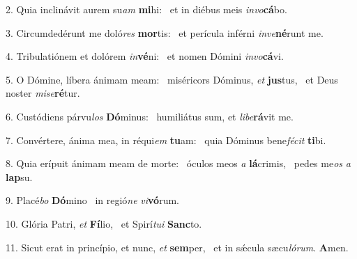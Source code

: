 2. Quia inclinávit aurem su\textit{am} \textbf{mi}hi: \ast\  et in diébus meis \textit{in}\textit{vo}\textbf{cá}bo.\

3. Circumdedérunt me doló\textit{res} \textbf{mor}tis: \ast\  et perícula inférni \textit{in}\textit{ve}\textbf{né}runt me.\

4. Tribulatiónem et dolórem \textit{in}\textbf{vé}ni: \ast\  et nomen Dómini \textit{in}\textit{vo}\textbf{cá}vi.\

5. O Dómine, líbera ánimam meam: \dag\  miséricors Dóminus, \textit{et} \textbf{jus}tus, \ast\  et Deus noster \textit{mi}\textit{se}\textbf{ré}tur.\

6. Custódiens párvu\textit{los} \textbf{Dó}minus: \ast\  humiliátus sum, et \textit{li}\textit{be}\textbf{rá}vit me.\

7. Convértere, ánima mea, in réqui\textit{em} \textbf{tu}am: \ast\  quia Dóminus bene\textit{fé}\textit{cit} \textbf{ti}bi.\

8. Quia erípuit ánimam meam de morte: \dag\  óculos meos \textit{a} \textbf{lá}crimis, \ast\  pedes me\textit{os} \textit{a} \textbf{lap}su.\

9. Placé\textit{bo} \textbf{Dó}mino \ast\  in regió\textit{ne} \textit{vi}\textbf{vó}rum.\

10. Glória Patri, \textit{et} \textbf{Fí}lio, \ast\  et Spirí\textit{tu}\textit{i} \textbf{Sanc}to.\

11. Sicut erat in princípio, et nunc, \textit{et} \textbf{sem}per, \ast\  et in sǽcula sæcu\textit{ló}\textit{rum}. \textbf{A}men.\

